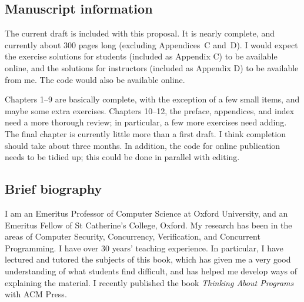 \documentclass[12pt,a4paper]{article}
\begin{document}

\subsection*{Manuscript information}

The current draft is included with this proposal.  It is nearly complete, and
currently about 300 pages long (excluding Appendices~C and~D).  I would expect
the exercise solutions for students (included as Appendix C) to be available
online, and the solutions for instructors (included as Appendix D) to be
available from me.  The code would also be available online.

Chapters 1--9 are basically complete, with the exception of a few small items,
and maybe some extra exercises.  Chapters 10--12, the preface,  appendices,
and index need a more thorough review; in particular, a few more exercises
need adding.  The final chapter is currently little more than a first draft.
I think completion should take about three months.  In addition, the code for
online publication needs to be tidied up; this could be done in parallel with
editing.



\subsection*{Brief biography}

I am an Emeritus Professor of Computer Science at Oxford University, and an
Emeritus Fellow of St Catherine's College, Oxford.  My research has been in
the areas of Computer Security, Concurrency, Verification, and Concurrent
Programming.  I have over 30 years' teaching experience.  In particular, I
have lectured and tutored the subjects of this book, which has given me a very
good understanding of what students find difficult, and has helped me develop
ways of explaining the material.  I recently published the book \emph{Thinking
  About Programs} with ACM Press. 
\end{document}

